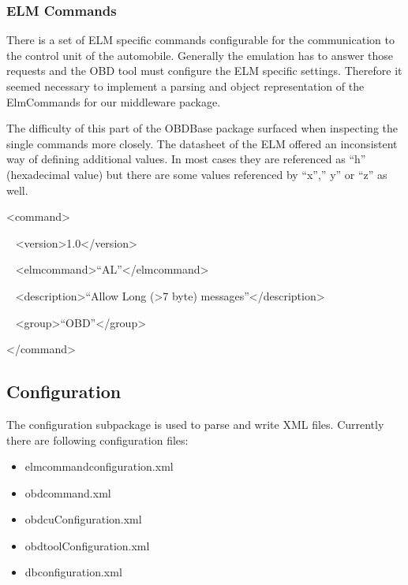 \hypertarget{h.wbiklph9gdnl}{\subsubsection{\texorpdfstring{{ELM
Commands}}{ELM Commands}}\label{h.wbiklph9gdnl}}

{There is a set of ELM specific commands configurable for the
communication to the control unit of the automobile. Generally the
emulation has to answer those requests and the OBD tool must configure
the ELM specific settings. Therefore it seemed necessary to implement a
parsing and object representation of the ElmCommands for our middleware
package.}

{The difficulty of this part of the OBDBase package surfaced when
inspecting the single commands more closely. The datasheet of the ELM
offered an inconsistent way of defining additional values. In most cases
they are referenced as ``h'' (hexadecimal value) but there are some
values referenced by ``x'','' y'' or ``z'' as well.}

{\textless{}command\textgreater{}}

{~
}{\textless{}version\textgreater{}}{1.0}{\textless{}/version\textgreater{}}

{~
}{\textless{}elmcommand\textgreater{}}{``AL''}{\textless{}/elmcommand\textgreater{}}

{~ }{\textless{}description\textgreater{}}{``Allow Long (\textgreater{}7
byte) messages''}{\textless{}/description\textgreater{} }

{~
}{\textless{}group\textgreater{}}{``OBD''}{\textless{}/group\textgreater{}}

{\textless{}/command\textgreater{}}

\hypertarget{h.8c6emwe3lhuv}{\subsection{\texorpdfstring{{Configuration}}{Configuration}}\label{h.8c6emwe3lhuv}}

{The configuration subpackage is used to parse and write XML files.
Currently there are following configuration files: }

\begin{itemize}
\tightlist
\item
  {elmcommandconfiguration.xml}
\item
  {obdcommand.xml}
\item
  {obdcuConfiguration.xml}
\item
  {obdtoolConfiguration.xml}
\item
  {dbconfiguration.xml}
\end{itemize}

